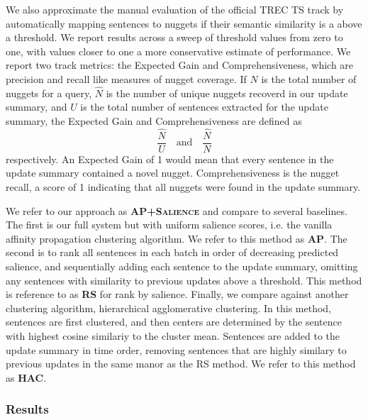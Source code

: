     
    We also approximate the manual evaluation of the official TREC TS track
    by automatically mapping sentences to nuggets if their semantic similarity
    is a above a threshold. We report results across a sweep of threshold 
    values from zero to one, with values closer to one a more conservative
    estimate of performance. We report two track metrics: the Expected Gain 
    and Comprehensiveness,  
    which are precision and recall like measures of nugget 
    coverage. If $N$ is the total number of nuggets for a query, $\hat{N}$ is 
    the number of unique nuggets recoverd in our 
    update 
    summary, and $U$ is the total number of sentences extracted for the update
    summary, the Expected Gain and Comprehensiveness are defined as
    \[ \frac{\hat{N}}{U} \quad \textrm{and} \quad \frac{\hat{N}}{N} \]
    respectively. An Expected Gain of 1 would mean that every sentence in
    the update summary contained a novel nugget. Comprehensiveness is the 
    nugget recall, a score of 1 indicating that all nuggets were found
    in the update summary.
    

    We refer to our approach as \textbf{\textsc{AP+Salience}} and compare to 
    several 
    baselines.
    The first is our full system but with uniform salience scores, i.e.
    the vanilla affinity propagation clustering algorithm. We refer to
    this method as \textbf{\textsc{AP}}.
    The second is to rank all sentences in each batch in order of decreasing
    predicted
    salience, and sequentially adding each sentence to the update summary, 
    omitting
    any sentences with similarity to previous updates above a threshold.
    This method is reference to as \textbf{\textsc{RS}} for rank by salience.
    Finally, we compare against another clustering algorithm,
    hierarchical agglomerative clustering.
    In this method, sentences are first clustered, 
    and then centers are determined by the sentence
    with  highest  cosine  similariy  to  the  cluster
    mean. 
    Sentences are added to the update summary in time order, 
    removing sentences that are highly similary to previous updates in the
    same manor as the \textsc{RS} method. We refer to this method as 
    \textbf{\textsc{HAC}}.



    
    

    \subsubsection{Results}

